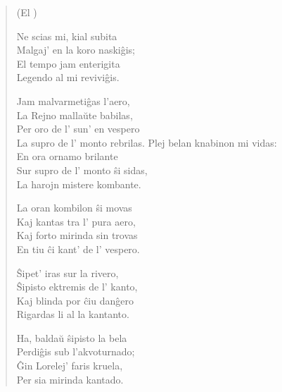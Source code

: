 \begin{verse}
\begin{center}
\footnotesize (El )
\end{center}

                     Ne scias mi, kial subita\\
                     Malgaj' en la koro naski\^gis;\\
                     El tempo jam enterigita\\
                     Legendo al mi revivi\^gis.

                      \vin  Jam malvarmeti\^gas l'aero,\\
                      \vin  La Rejno malla\u ute babilas,\\
                      \vin  Per oro de l' sun' en vespero\\
                      \vin  La supro de l' monto rebrilas.
\newpage
                     Plej belan knabinon mi vidas:\\
                     En ora ornamo brilante\\
                     Sur supro de l' monto \^si sidas,\\
                     La harojn mistere kombante.

                     \vin   La oran kombilon \^si movas\\
                     \vin   Kaj kantas tra l' pura aero,\\
                     \vin   Kaj forto mirinda sin trovas\\
                     \vin   En tiu \^ci kant' de l' vespero.

                     \^Sipet' iras sur la rivero,\\
                     \^Sipisto ektremis de l' kanto,\\
                     Kaj blinda por \^ciu dan\^gero\\
                     Rigardas li al la kantanto.

                      \vin  Ha, balda\u u \^sipisto la bela\\
                      \vin  Perdi\^gis sub l'akvoturnado;\\
                      \vin  \^Gin Lorelej' faris kruela,\\
                      \vin  Per sia mirinda kantado.

\end{verse}


\smallrule{}

